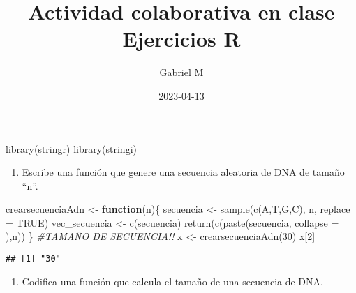 \documentclass[
]{article}
\title{Actividad colaborativa en clase \textbar{} Ejercicios R}
\author{Gabriel M}
\date{2023-04-13}
\newenvironment{Shaded}{\begin{snugshade}}{\end{snugshade}}
\newcommand{\AttributeTok}[1]{\textcolor[rgb]{0.77,0.63,0.00}{#1}}
\newcommand{\CommentTok}[1]{\textcolor[rgb]{0.56,0.35,0.01}{\textit{#1}}}
\newcommand{\ConstantTok}[1]{\textcolor[rgb]{0.00,0.00,0.00}{#1}}
\newcommand{\ControlFlowTok}[1]{\textcolor[rgb]{0.13,0.29,0.53}{\textbf{#1}}}
\newcommand{\DecValTok}[1]{\textcolor[rgb]{0.00,0.00,0.81}{#1}}
\newcommand{\FunctionTok}[1]{\textcolor[rgb]{0.00,0.00,0.00}{#1}}
\newcommand{\NormalTok}[1]{#1}
\newcommand{\OtherTok}[1]{\textcolor[rgb]{0.56,0.35,0.01}{#1}}
\newcommand{\StringTok}[1]{\textcolor[rgb]{0.31,0.60,0.02}{#1}}
\providecommand{\tightlist}{%
  \setlength{\itemsep}{0pt}\setlength{\parskip}{0pt}}
\begin{document}
\maketitle

\begin{Shaded}
\begin{Highlighting}[]
\FunctionTok{library}\NormalTok{(}\StringTok{\textquotesingle{}stringr\textquotesingle{}}\NormalTok{)}
\FunctionTok{library}\NormalTok{(}\StringTok{\textquotesingle{}stringi\textquotesingle{}}\NormalTok{)}
\end{Highlighting}
\end{Shaded}

\begin{enumerate}
\def\labelenumi{\arabic{enumi}.}
\tightlist
\item
  Escribe una función que genere una secuencia aleatoria de DNA de
  tamaño ``n''.
\end{enumerate}

\begin{Shaded}
\begin{Highlighting}[]
\NormalTok{crearsecuenciaAdn }\OtherTok{\textless{}{-}} \ControlFlowTok{function}\NormalTok{(n)\{}
\NormalTok{  secuencia }\OtherTok{\textless{}{-}} \FunctionTok{sample}\NormalTok{(}\FunctionTok{c}\NormalTok{(}\StringTok{\textquotesingle{}A\textquotesingle{}}\NormalTok{,}\StringTok{\textquotesingle{}T\textquotesingle{}}\NormalTok{,}\StringTok{\textquotesingle{}G\textquotesingle{}}\NormalTok{,}\StringTok{\textquotesingle{}C\textquotesingle{}}\NormalTok{), n, }\AttributeTok{replace =} \ConstantTok{TRUE}\NormalTok{)}
\NormalTok{  vec\_secuencia }\OtherTok{\textless{}{-}} \FunctionTok{c}\NormalTok{(secuencia)}
  \FunctionTok{return}\NormalTok{(}\FunctionTok{c}\NormalTok{(}\FunctionTok{paste}\NormalTok{(secuencia, }\AttributeTok{collapse =} \StringTok{\textquotesingle{}\textquotesingle{}}\NormalTok{),n))}
\NormalTok{\}}
\CommentTok{\#TAMAÑO DE SECUENCIA!!}
\NormalTok{x }\OtherTok{\textless{}{-}} \FunctionTok{crearsecuenciaAdn}\NormalTok{(}\DecValTok{30}\NormalTok{)}
\NormalTok{x[}\DecValTok{2}\NormalTok{]}
\end{Highlighting}
\end{Shaded}

\begin{verbatim}
## [1] "30"
\end{verbatim}

\begin{enumerate}
\def\labelenumi{\arabic{enumi}.}
\setcounter{enumi}{1}
\tightlist
\item
  Codifica una función que calcula el tamaño de una secuencia de DNA.
\end{enumerate}
\end{document}
